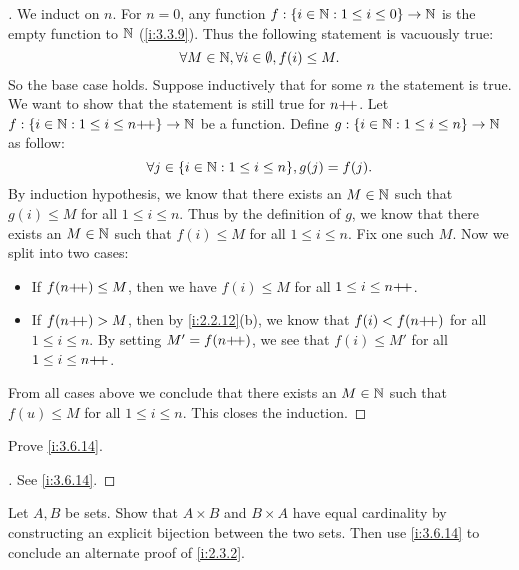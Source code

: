 \begin{proof}[]
  We induct on \(n\).
  For \(n = 0\), any function \(f : \left\lbrace i \in \mathbb{N} : 1 \leq i \leq 0\right\rbrace \to \mathbb{N}\) is the empty function to \(\mathbb{N}\) (\cref{i:3.3.9}).
  Thus the following statement is vacuously true:
  \[
    \forall M \in \mathbb{N}, \forall i \in \emptyset, f(i) \leq M.
  \]
  So the base case holds.
  Suppose inductively that for some \(n\) the statement is true.
  We want to show that the statement is still true for \(n{+}\!{+}\).
  Let \(f : \left\lbrace i \in \mathbb{N} : 1 \leq i \leq n{+}\!{+}\right\rbrace \to \mathbb{N}\) be a function.
  Define \(g : \left\lbrace i \in \mathbb{N} : 1 \leq i \leq n\right\rbrace \to \mathbb{N}\) as follow:
  \[
    \forall j \in \set{i \in \N : 1 \leq i \leq n}, g(j) = f(j).
  \]
  By induction hypothesis, we know that there exists an \(M \in \mathbb{N}\) such that \(g(i) \leq M\) for all \(1 \leq i \leq n\).
  Thus by the definition of \(g\), we know that there exists an \(M \in \mathbb{N}\) such that \(f(i) \leq M\) for all \(1 \leq i \leq n\).
  Fix one such \(M\).
  Now we split into two cases:
  \begin{itemize}
    \item If \(f(n{+}\!{+}) \leq M\), then we have \(f(i) \leq M\) for all \(1 \leq i \leq n{+}\!{+}\).
    \item If \(f(n{+}\!{+}) > M\), then by \cref{i:2.2.12}(b), we know that \(f(i) < f(n{+}\!{+})\) for all \(1 \leq i \leq n\).
          By setting \(M' = f(n{+}\!{+})\), we see that \(f(i) \leq M'\) for all \(1 \leq i \leq n{+}\!{+}\).
  \end{itemize}
  From all cases above we conclude that there exists an \(M \in \mathbb{N}\) such that \(f(u) \leq M\) for all \(1 \leq i \leq n\).
  This closes the induction.
\end{proof}

\begin{ex}\label{i:ex:3.6.4}
  Prove \cref{i:3.6.14}.
\end{ex}

\begin{proof}[]
  See \cref{i:3.6.14}.
\end{proof}

\begin{ex}\label{i:ex:3.6.5}
  Let \(A, B\) be sets.
  Show that \(A \times B\) and \(B \times A\) have equal cardinality by constructing an explicit bijection between the two sets.
  Then use \cref{i:3.6.14} to conclude an alternate proof of \cref{i:2.3.2}.
\end{ex}

